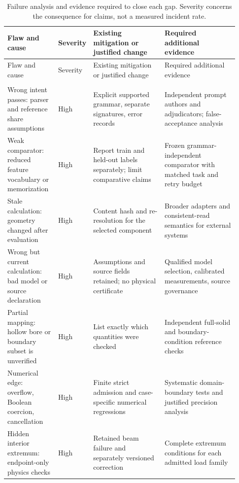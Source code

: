 \documentclass[10pt]{article}
\begin{document}
\begingroup
\small
\setlength{\tabcolsep}{4pt}
\begin{longtable}{>{\raggedright\arraybackslash}p{0.22\linewidth}>{\raggedright\arraybackslash}p{0.08\linewidth}>{\raggedright\arraybackslash}p{0.31\linewidth}>{\raggedright\arraybackslash}p{0.32\linewidth}}
\caption{Failure analysis and evidence required to close each gap.
Severity concerns the consequence for claims, not a measured incident rate.}
\label{tab:failure}\\
\toprule
Flaw and cause & Severity & Existing mitigation or justified change &
Required additional evidence \\
\midrule
\endfirsthead
\toprule
Flaw and cause & Severity & Existing mitigation or justified change &
Required additional evidence \\
\midrule
\endhead
\midrule
\multicolumn{4}{r}{\emph{Continued on next page}}\\
\endfoot
\bottomrule
\endlastfoot
Wrong intent passes: parser and reference share assumptions &
High & Explicit supported grammar, separate signatures, error records &
Independent prompt authors and adjudicators; false-acceptance analysis \\
Weak comparator: reduced feature vocabulary or memorization &
High & Report train and held-out labels separately; limit comparative claims &
Frozen grammar-independent comparator with matched task and retry budget \\
Stale calculation: geometry changed after evaluation &
High & Content hash and re-resolution for the selected component &
Broader adapters and consistent-read semantics for external systems \\
Wrong but current calculation: bad model or source declaration &
High & Assumptions and source fields retained; no physical certificate &
Qualified model selection, calibrated measurements, source governance \\
Partial mapping: hollow bore or boundary subset is unverified &
High & List exactly which quantities were checked &
Independent full-solid and boundary-condition reference checks \\
Numerical edge: overflow, Boolean coercion, cancellation &
High & Finite strict admission and case-specific numerical regressions &
Systematic domain-boundary tests and justified precision analysis \\
Hidden interior extremum: endpoint-only physics checks &
High & Retained beam failure and separately versioned correction &
Complete extremum conditions for each admitted load family \\

\end{longtable}
\end{document}
